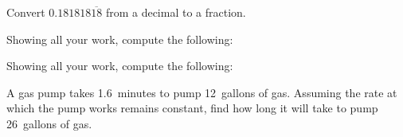 \documentclass[12pt,letterpaper]{exam}
\begin{document}
\begin{questions}
 \vfill





\newpage
\question[6] Convert $0.181818\overline{18}$ from a decimal to a fraction. \pspace





\newpage
\question[6] Showing all your work, compute the following: \pspace
{}

\vfill

\question[6] Showing all your work, compute the following: \pspace
{} \vfill





\newpage
\question[6] A gas pump takes 1.6~minutes to pump 12~gallons of gas. Assuming the rate at which the pump works remains constant, find how long it will take to pump 26~gallons of gas. \pspace






\end{questions}
\end{document}
